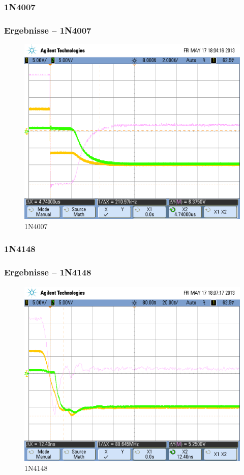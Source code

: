 \subsubsection{1N4007}
\begin{frame}
\frametitle{Ergebnisse -- 1N4007}
  \begin{figure}
    \includegraphics[width=0.7\columnwidth]{fig/scope_18.png}
    \caption{1N4007}
  \end{figure}
\end{frame}

\subsubsection{1N4148}
\begin{frame}
\frametitle{Ergebnisse -- 1N4148}
  \begin{figure}
    \includegraphics[width=0.7\columnwidth]{fig/scope_19.png}
    \caption{1N4148}
  \end{figure}
\end{frame}

